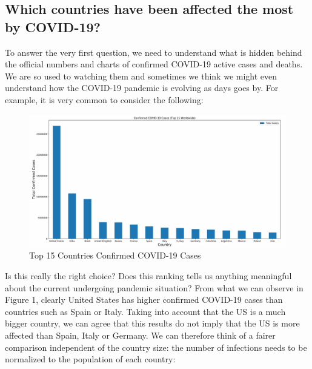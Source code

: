 \documentclass[11pt,a4paper]{article}
\begin{document}
\subsection{Which countries have been affected the most by COVID-19?}
To answer the very first question, we need to understand what is hidden behind
the official numbers and charts of confirmed COVID-19 active cases and deaths.
We are so used to watching them and sometimes we think we might even understand
how the COVID-19 pandemic is evolving as days goes by. For example, it is very
common to consider the following:
\begin{figure}[H]
    \begin{center}
        \hspace*{-1.8cm}
        \includegraphics[scale=0.44]{img/total-cases.pdf}
    \end{center}
    \vspace*{-0.4cm}
    \caption{Top 15 Countries Confirmed COVID-19 Cases}
\end{figure}
\noindent Is this really the right choice? Does this ranking tells us anything
meaningful about the current undergoing pandemic situation? From what we can
observe in Figure 1, clearly United States has higher confirmed COVID-19 cases
than countries such as Spain or Italy. Taking into account that the US is a much
bigger country, we can agree that this results do not imply that the US is more
affected than Spain, Italy or Germany. We can therefore think of a fairer
comparison independent of the country size: the number of infections needs to be
normalized to the population of each country:
\end{document}
